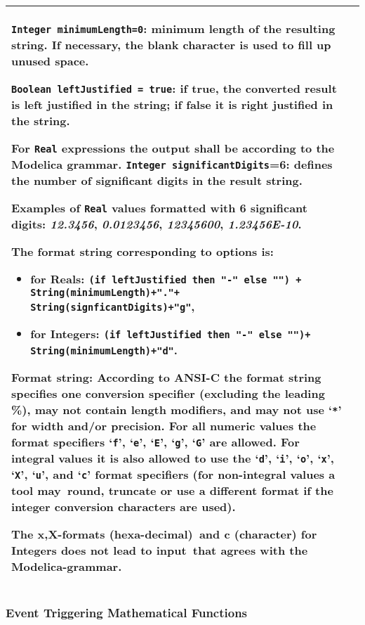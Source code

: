 \begin{longtable}{|p{4.5cm}|p{10cm}|}
\lstinline!Integer minimumLength=0!: minimum length of the resulting string. If
necessary, the blank character is used to fill up unused space.

\lstinline!Boolean leftJustified = true!: if true, the converted result is left
justified in the string; if false it is right justified in the string.

For \lstinline!Real! expressions the output shall be according to the Modelica
grammar. \lstinline!Integer significantDigits!=6: defines the number of significant
digits in the result string.

\begin{nonnormative}
Examples of \lstinline!Real! values formatted with 6 significant digits: \emph{12.3456}, \emph{0.0123456}, \emph{12345600}, \emph{1.23456E-10}.
\end{nonnormative}

The format string corresponding to options is:
\begin{itemize}
\item
  for Reals: %
  \lstinline!(if leftJustified then "-" else "") +  String(minimumLength)+"."+ String(signficantDigits)+"g"!,
\item
  for Integers: %
  \lstinline!(if leftJustified then "-" else "")+ String(minimumLength)+"d"!.
\end{itemize}

Format string: According to ANSI-C the format string specifies one
conversion specifier (excluding the leading \%), may not contain length
modifiers, and may not use `\lstinline!*!' for width and/or precision. For all
numeric values the format specifiers `\lstinline!f!', `\lstinline!e!', `\lstinline!E!', `\lstinline!g!', `\lstinline!G!' are allowed. For
integral values it is also allowed to use the `\lstinline!d!', `\lstinline!i!', `\lstinline!o!', `\lstinline!x!', `\lstinline!X!', `\lstinline!u!', and
`\lstinline!c!' format specifiers (for non-integral values a tool may~round, truncate
or use a different format if the integer conversion characters are
used).

The x,X-formats (hexa-decimal)~and c (character) for Integers does not
lead to input~that agrees with the Modelica-grammar.\\ \hline
\end{longtable}

\subsubsection{Event Triggering Mathematical Functions}\label{event-triggering-mathematical-functions}

